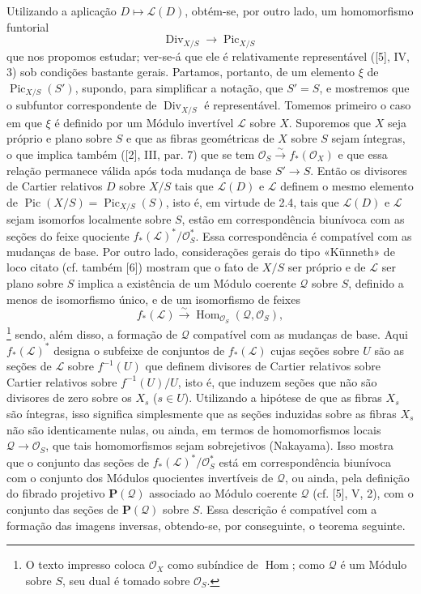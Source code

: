 Utilizando a aplicação $D\longmapsto\mathcal L(D)$, obtém-se, por outro lado,
um homomorfismo funtorial
\begin{equation}
\operatorname{Div}_{X/S}\longrightarrow\operatorname{Pic}_{X/S}
\tag{+}
\end{equation}
que nos propomos estudar; ver-se-á que ele é relativamente representável ([5],
IV, 3) sob condições bastante gerais. Partamos, portanto, de um elemento $\xi$
de $\operatorname{Pic}_{X/S}(S')$, supondo, para simplificar a notação, que
$S'=S$, e mostremos que o subfuntor correspondente de
$\operatorname{Div}_{X/S}$ é representável. Tomemos primeiro o caso em que
$\xi$ é definido por um Módulo invertível $\mathcal L$ sobre $X$. Suporemos
que $X$ seja próprio e plano sobre $S$ e que as fibras geométricas de $X$
sobre $S$ sejam íntegras, o que implica também ([2], III, par. 7) que se tem
$\mathcal O_S\xrightarrow{\sim}f_*(\mathcal O_X)$ e que essa relação permanece
válida após toda mudança de base $S'\longrightarrow S$. Então os divisores de
Cartier relativos $D$ sobre $X/S$ tais que $\mathcal L(D)$ e $\mathcal L$
definem o mesmo elemento de
$\operatorname{Pic}(X/S)=\operatorname{Pic}_{X/S}(S)$, isto é, em virtude de
2.4, tais que $\mathcal L(D)$ e $\mathcal L$ sejam isomorfos localmente sobre
$S$, estão em correspondência biunívoca com as seções do feixe quociente
$f_*(\mathcal L)^*/\mathcal O_S^*$. Essa correspondência é compatível com as
mudanças de base. Por outro lado, considerações gerais do tipo «Künneth» de
loco citato (cf. também [6]) mostram que o fato de $X/S$ ser próprio e de
$\mathcal L$ ser plano sobre $S$ implica a existência de um Módulo coerente
$\mathcal Q$ sobre $S$, definido a menos de isomorfismo único, e de um
isomorfismo de feixes
\[
f_*(\mathcal L)\xrightarrow{\sim}
\operatorname{Hom}_{\mathcal O_S}(\mathcal Q,\mathcal O_S),
\]
\footnote{O texto impresso coloca $\mathcal O_X$ como subíndice de
$\operatorname{Hom}$; como $\mathcal Q$ é um Módulo sobre $S$, seu dual é
tomado sobre $\mathcal O_S$.} sendo, além disso, a formação de $\mathcal Q$
compatível com as mudanças de base. Aqui $f_*(\mathcal L)^*$ designa o
subfeixe de conjuntos de $f_*(\mathcal L)$ cujas seções sobre $U$ são as
seções de $\mathcal L$ sobre $f^{-1}(U)$ que definem divisores de Cartier
relativos sobre
Cartier relativos sobre $f^{-1}(U)/U$, isto é, que induzem seções que não são
divisores de zero sobre os $X_s$ ($s\in U$). Utilizando a hipótese de que as
fibras $X_s$ são íntegras, isso significa simplesmente que as seções induzidas
sobre as fibras $X_s$ não são identicamente nulas, ou ainda, em termos de
homomorfismos locais $\mathcal Q\longrightarrow\mathcal O_S$, que tais
homomorfismos sejam sobrejetivos (Nakayama). Isso mostra que o conjunto das
seções de $f_*(\mathcal L)^*/\mathcal O_S^*$ está em correspondência biunívoca
com o conjunto dos Módulos quocientes invertíveis de $\mathcal Q$, ou ainda,
pela definição do fibrado projetivo $\mathbf P(\mathcal Q)$ associado ao Módulo
coerente $\mathcal Q$ (cf. [5], V, 2), com o conjunto das seções de
$\mathbf P(\mathcal Q)$ sobre $S$. Essa descrição é compatível com a formação
das imagens inversas, obtendo-se, por conseguinte, o teorema seguinte.

